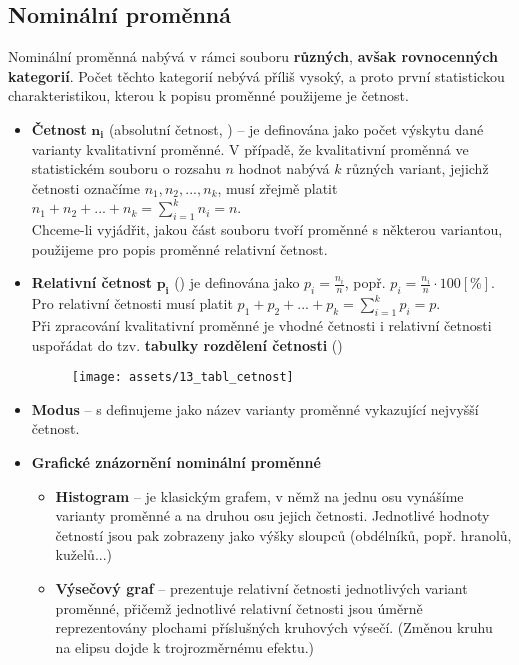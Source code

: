 \subsection{Nominální proměnná}
Nominální proměnná nabývá v rámci souboru \textbf{různých}, \textbf{avšak rovnocenných kategorií}. Počet těchto kategorií nebývá příliš vysoký, a proto první statistickou charakteristikou, kterou k popisu proměnné použijeme je četnost.
\begin{itemize}
    \item \textbf{Četnost} $\mathbf{n_i}$ (absolutní četnost, ) --  je definována jako počet výskytu dané varianty kvalitativní proměnné. V případě, že kvalitativní proměnná ve statistickém souboru o rozsahu $n$ hodnot  nabývá $k$ různých variant, jejichž četnosti označíme $n_1, n_2, ... , n_k$, musí zřejmě platit $n_1 + n_2 + ... + n_k = \sum\limits_{i=1}^k n_i = n$. \\
          Chceme-li vyjádřit, jakou část souboru tvoří proměnné s některou variantou, použijeme pro popis proměnné relativní četnost.

    \item \textbf{Relativní četnost} $\mathbf{p_i}$ () je definována jako $p_i = \frac{n_i}{n}$, popř. $p_i = \frac{n_i}{n} \cdot 100 [\%]$. Pro relativní četnosti musí platit $p_1 + p_2 + ... + p_k = \sum\limits_{i=1}^k p_i = p$. \\
          Při zpracování kvalitativní proměnné je vhodné četnosti i relativní četnosti uspořádat do tzv. \textbf{tabulky rozdělení četnosti} ()
          \begin{figure}[H]
              \centering
              \texttt{[image: assets/13\_tabl\_cetnost]}
          \end{figure}
    \item \textbf{Modus} -- s definujeme jako název varianty proměnné vykazující nejvyšší četnost.\\
    \item \textbf{Grafické znázornění nominální proměnné}
          \begin{itemize}
              \item \textbf{Histogram} -- je klasickým grafem, v němž na jednu osu vynášíme varianty proměnné a na druhou osu jejich četnosti. Jednotlivé hodnoty četností jsou pak zobrazeny jako výšky sloupců (obdélníků, popř. hranolů, kuželů...)
              \item \textbf{Výsečový graf} -- prezentuje relativní četnosti jednotlivých variant proměnné, přičemž jednotlivé relativní četnosti jsou úměrně reprezentovány plochami příslušných kruhových výsečí. (Změnou kruhu na elipsu dojde k trojrozměrnému efektu.)
          \end{itemize}
\end{itemize}
